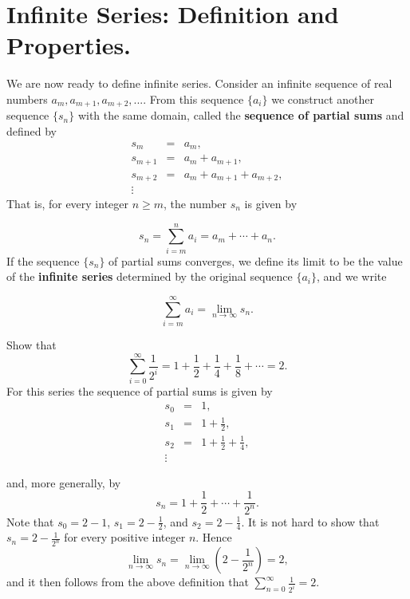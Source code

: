 \section{Infinite Series: Definition and Properties.}
We are now ready to define infinite series. Consider an infinite sequence of real numbers $a_m, a_{m+1},
a_{m+2},... .$ From this sequence $\{a_i\}$ we construct another sequence $\{s_n\}$ with the same domain, called the \textbf{sequence of partial sums} and defined by
\begin{eqnarray*}
      s_m &=& a_m, \\
s_{m+1} &=& a_m + a_{m+1}, \\
s_{m+2} &=& a_m + a_{m+1} + a_{m+2}, \\
\vdots
\end{eqnarray*}
\noindent That is, for every integer $n \geq m$, the number $s_n$ is given by

\begin{equation}
s_n = \sum_{i=m}^n a_i = a_m + \cdots + a_n . 
\label{eq9.2.1}
\end{equation}
\noindent If the sequence $\{s_n\}$ of partial sums converges, we define its limit to be the value of the \textbf{infinite series} determined by the original sequence $\{a_i\}$, and we write

\begin{equation}
\sum_{i=m}^\infty a_i = \lim_{n \rightarrow \infty} s_n.
\label{eq9.2.2}
\end{equation}


\begin{example}
Show that
$$
\sum_{i=0}^\infty \frac{1}{2^i} = 1 + \frac{1}{2} + \frac{1}{4} + \frac{1}{8} + \cdots = 2.
$$
\noindent For this series the sequence of partial sums is given by 
\begin{eqnarray*}
s_0 &=& 1, \\
s_1 &=& 1 + \frac{1}{2}, \\
s_2 &=& 1 + \frac{1}{2} + \frac{1}{4},\\
\vdots  
\end{eqnarray*}

\noindent and, more generally, by
$$
s_n = 1 + \frac{1}{2} + \cdots + \frac{1}{2^n} .
$$
\noindent Note that $s_0 = 2 - 1$, $s_1 = 2 - \frac{1}{2}$, and $s_2 = 2 - \frac{1}{4}$. It is not hard to show that $s_n = 2 - \frac{1}{2^n}$ for every positive integer $n$. Hence
$$
\lim_{n \rightarrow \infty} s_n = \lim_{n \rightarrow \infty} (2 - \frac{1}{2^n}) = 2, 
$$
\noindent and it then follows from the above definition that $\sum_{n=0}^\infty \frac{1}{2^i} = 2$. 

\end{example}

